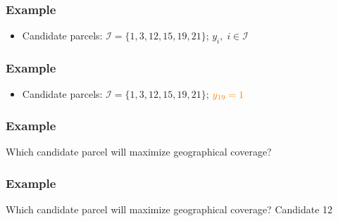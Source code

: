 \documentclass[10pt, compress]{beamer}
\begin{document}
\begin{frame}[fragile]
  \frametitle{Example}
  \begin{center}
\end{center}
\begin{itemize}
\item Candidate parcels: $\mathcal{I} = \{1,3,12,15,19,21\}$; \;$y_i, \; i \in \mathcal{I}$
\end{itemize}
\end{frame}

\begin{frame}[fragile]
  \frametitle{Example}
  \begin{center}
\end{center}
\begin{itemize}
\item Candidate parcels: $\mathcal{I} = \{1,3,12,15,19,21\}$; \; $\color{orange} y_{19} = 1$
\end{itemize}
\end{frame}

\begin{frame}[fragile]
  \frametitle{Example}
  \begin{center}
\end{center}
\begin{block}{Which candidate parcel will maximize geographical coverage?}
\end{block}
\end{frame}

\begin{frame}[fragile]
  \frametitle{Example}
  \begin{center}
\end{center}
\begin{block}{Which candidate parcel will maximize geographical coverage?}
\alert{Candidate 12}
\end{block}
\end{frame}
\end{document}
